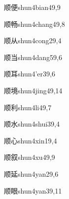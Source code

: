\begin{verbete}{顺便}{shun4bian4}{9,9}
\end{verbete}

\begin{verbete}{顺畅}{shun4chang4}{9,8}
\end{verbete}

\begin{verbete}{顺从}{shun4cong2}{9,4}
\end{verbete}

\begin{verbete}{顺当}{shun4dang5}{9,6}
\end{verbete}

\begin{verbete}{顺耳}{shun4'er3}{9,6}
\end{verbete}

\begin{verbete}{顺境}{shun4jing4}{9,14}
\end{verbete}

\begin{verbete}{顺利}{shun4li4}{9,7}
\end{verbete}

\begin{verbete}{顺水}{shun4shui3}{9,4}
\end{verbete}

\begin{verbete}{顺心}{shun4xin1}{9,4}
\end{verbete}

\begin{verbete}{顺叙}{shun4xu4}{9,9}
\end{verbete}

\begin{verbete}{顺延}{shun4yan2}{9,6}
\end{verbete}

\begin{verbete}{顺眼}{shun4yan3}{9,11}
\end{verbete}

